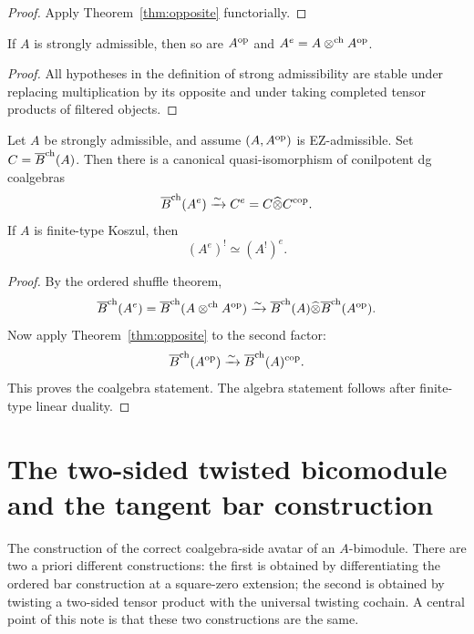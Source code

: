\begin{proof}
Apply Theorem~\ref{thm:opposite} functorially.
\end{proof}

\begin{lemma}
If $A$ is strongly admissible, then so are $A^{\mathrm{op}}$ and $A^e=A\mathbin{\otimes^{\mathrm{ch}}} A^{\mathrm{op}}$.
\end{lemma}

\begin{proof}
All hypotheses in the definition of strong admissibility are stable under replacing multiplication by
its opposite and under taking completed tensor products of filtered objects.
\end{proof}

\begin{corollary}
Let $A$ be strongly admissible, and assume $(A,A^{\mathrm{op}})$ is EZ-admissible. Set $C=\overline{B}^{\mathrm{ch}}(A)$.
Then there is a canonical quasi-isomorphism of conilpotent dg coalgebras
\[
\overline{B}^{\mathrm{ch}}(A^e)\xrightarrow{\sim} C^e=C\widehat\otimes C^{\mathrm{cop}}.
\]
If $A$ is finite-type Koszul, then
\[
(A^e)^!\simeq (A^!)^e.
\]
\end{corollary}

\begin{proof}
By the ordered shuffle theorem,
\[
\overline{B}^{\mathrm{ch}}(A^e)=\overline{B}^{\mathrm{ch}}(A\mathbin{\otimes^{\mathrm{ch}}} A^{\mathrm{op}})\xrightarrow{\sim}\overline{B}^{\mathrm{ch}}(A)\widehat\otimes \overline{B}^{\mathrm{ch}}(A^{\mathrm{op}}).
\]
Now apply Theorem~\ref{thm:opposite} to the second factor:
\[
\overline{B}^{\mathrm{ch}}(A^{\mathrm{op}})\xrightarrow{\sim}\overline{B}^{\mathrm{ch}}(A)^{\mathrm{cop}}.
\]
This proves the coalgebra statement. The algebra statement follows after finite-type linear duality.
\end{proof}

\section{The two-sided twisted bicomodule and the tangent bar construction}

The construction of the correct coalgebra-side avatar of an $A$-bimodule. There are two a priori
different constructions:
the first is obtained by differentiating the ordered bar construction at a square-zero extension;
the second is obtained by twisting a two-sided tensor product with the universal twisting cochain.
A central point of this note is that these two constructions are the same.

